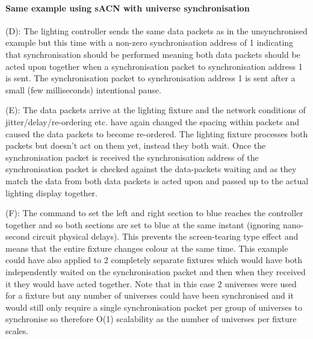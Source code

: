 \documentclass[11pt,a4paper]{article}
\begin{document}
\paragraph{Same example using sACN with universe synchronisation}
\begin{list}{}{}
	\item (D): The lighting controller sends the same data packets as in the unsynchronised example but this time with a non-zero synchronisation address of 1 indicating that synchronisation should be performed meaning both data packets should be acted upon together when a synchronisation packet to synchronisation address 1 is sent. The synchronisation packet to synchronisation address 1 is sent after a small (few milliseconds) intentional pause.
	
	\item (E): The data packets arrive at the lighting fixture and the network conditions of jitter/delay/re-ordering etc. have again changed the spacing within packets and caused the data packets to become re-ordered. The lighting fixture processes both packets but doesn't act on them yet, instead they both wait. Once the synchronisation packet is received the synchronisation address of the synchronisation packet is checked against the data-packets waiting and as they match the data from both data packets is acted upon and passed up to the actual lighting display together.
	
	\item (F): The command to set the left and right section to blue reaches the controller together and so both sections are set to blue at the same instant (ignoring nano-second circuit physical delays). This prevents the screen-tearing type effect and means that the entire fixture changes colour at the same time. This example could have also applied to 2 completely separate fixtures which would have both independently waited on the synchronisation packet and then when they received it they would have acted together. Note that in this case 2 universes were used for a fixture but any number of universes could have been synchronised and it would still only require a single synchronisation packet per group of universes to synchronise so therefore O(1) scalability as the number of universes per fixture scales.
\end{list}
\end{document}
